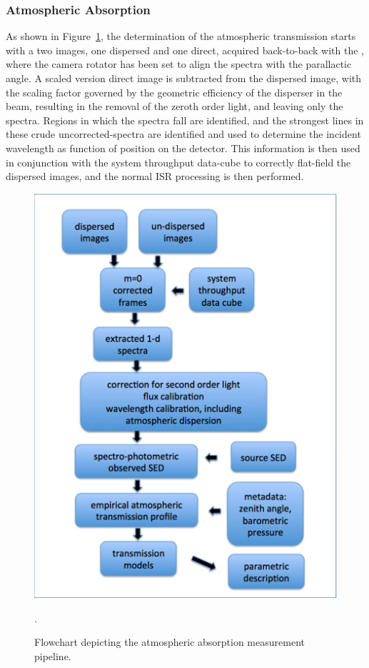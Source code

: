 \subsubsection{Atmospheric Absorption}\label{sec:CPP:aux:atmosphericAbsorption}
As shown in Figure~\ref{fig:aux_telescope}, the determination of the atmospheric transmission starts with a two images, one dispersed and one direct, acquired back-to-back with the \auxtelescope, where the camera rotator has been set to align the spectra with the parallactic angle. A scaled version direct image is subtracted from the dispersed image, with the scaling factor governed by the geometric efficiency of the disperser in the beam, resulting in the removal of the zeroth order light, and leaving only the spectra. Regions in which the spectra fall are identified, and the strongest lines in these crude uncorrected-spectra are identified and used to determine the incident wavelength as function of position on the detector. This information is then used in conjunction with the system throughput data-cube to correctly flat-field the dispersed images, and the normal ISR processing is then performed.

\begin{figure}
	\centering
	\includegraphics[width=\textwidth]{figures/aux_telescope_workflow.png}
	\caption{Flowchart depicting the atmospheric absorption measurement pipeline.}.
	\label{fig:aux_telescope}
\end{figure}

